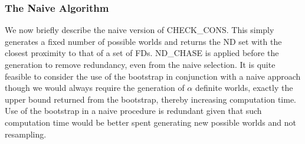 \subsubsection{The Naive Algorithm}

We now briefly describe the naive version of CHECK\_CONS. This simply
generates a fixed number of possible worlds and returns the ND set with
the closest proximity to that of a set of FDs. ND\_CHASE is applied
before the generation to remove redundancy, even from the naive selection.
It is quite feasible to consider the use of the bootstrap in conjunction
with a naive approach though we would always require the generation of 
$\alpha$ definite worlds, exactly the upper bound returned from the
bootstrap, thereby increasing computation time. Use of the bootstrap
in a naive procedure is redundant given that such computation time
would be better spent generating new possible worlds and not
resampling. 


